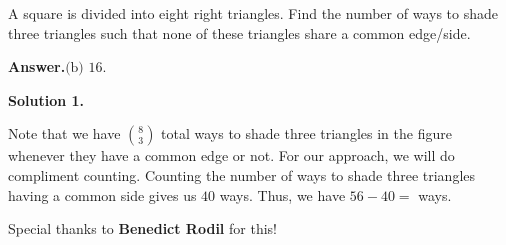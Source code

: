 \documentclass[11pt,paper=letter]{scrartcl}
\newcommand{\ans}[1]{{\sffamily \bfseries Answer.}\;\(\boxed{\text{#1}}\).}
\newcommand{\soln}[1]{{\sffamily \bfseries Solution #1.}\;}
\newenvironment{rem}%
{\noindent \ignorespaces \small \sffamily  \sansmath {\bfseries \color{DarkMidnightBlue} Remark.}}%
{\ignorespacesafterend}
\begin{document}
\begin{probboxed}
A square is divided into eight right triangles. Find the number of ways to shade three triangles such that none of these triangles share a common edge/side.
   
   \begin{center}
 



   \end{center}
   
\end{probboxed}


\ans{(b) 16}

\soln1


Note that we have $\binom 83$ total ways to shade three triangles in the figure whenever they have a common edge or not. For our approach, we will do compliment counting. Counting the number of ways to shade three triangles having a common side gives us $40$ ways. Thus, we have $56-40 =$  ways.


\begin{mdframed}
\begin{rem}
Special thanks to \textbf{Benedict Rodil} for this!
\end{rem}
\end{mdframed}

\newpage
\end{document}
